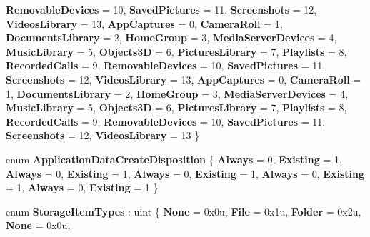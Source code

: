 \begin{DoxyCompactItemize}
{\bfseries Removable\+Devices} = 10, 
{\bfseries Saved\+Pictures} = 11, 
\newline
{\bfseries Screenshots} = 12, 
{\bfseries Videos\+Library} = 13, 
{\bfseries App\+Captures} = 0, 
{\bfseries Camera\+Roll} = 1, 
\newline
{\bfseries Documents\+Library} = 2, 
{\bfseries Home\+Group} = 3, 
{\bfseries Media\+Server\+Devices} = 4, 
{\bfseries Music\+Library} = 5, 
\newline
{\bfseries Objects3D} = 6, 
{\bfseries Pictures\+Library} = 7, 
{\bfseries Playlists} = 8, 
{\bfseries Recorded\+Calls} = 9, 
\newline
{\bfseries Removable\+Devices} = 10, 
{\bfseries Saved\+Pictures} = 11, 
{\bfseries Screenshots} = 12, 
{\bfseries Videos\+Library} = 13, 
\newline
{\bfseries App\+Captures} = 0, 
{\bfseries Camera\+Roll} = 1, 
{\bfseries Documents\+Library} = 2, 
{\bfseries Home\+Group} = 3, 
\newline
{\bfseries Media\+Server\+Devices} = 4, 
{\bfseries Music\+Library} = 5, 
{\bfseries Objects3D} = 6, 
{\bfseries Pictures\+Library} = 7, 
\newline
{\bfseries Playlists} = 8, 
{\bfseries Recorded\+Calls} = 9, 
{\bfseries Removable\+Devices} = 10, 
{\bfseries Saved\+Pictures} = 11, 
\newline
{\bfseries Screenshots} = 12, 
{\bfseries Videos\+Library} = 13
 \}
\item 
\mbox{\label{namespace_windows_1_1_storage_ad31753d0e1a55938e5b849af2661f220}} 
enum {\bfseries Application\+Data\+Create\+Disposition} \{ \newline
{\bfseries Always} = 0, 
{\bfseries Existing} = 1, 
{\bfseries Always} = 0, 
{\bfseries Existing} = 1, 
\newline
{\bfseries Always} = 0, 
{\bfseries Existing} = 1, 
{\bfseries Always} = 0, 
{\bfseries Existing} = 1, 
\newline
{\bfseries Always} = 0, 
{\bfseries Existing} = 1
 \}
\item 
\mbox{\label{namespace_windows_1_1_storage_afbbba3be392001933e27301572dd9adc}} 
enum {\bfseries Storage\+Item\+Types} \+: uint \{ \newline
{\bfseries None} = 0x0u, 
{\bfseries File} = 0x1u, 
{\bfseries Folder} = 0x2u, 
{\bfseries None} = 0x0u, 
\newline

\end{DoxyCompactItemize}
